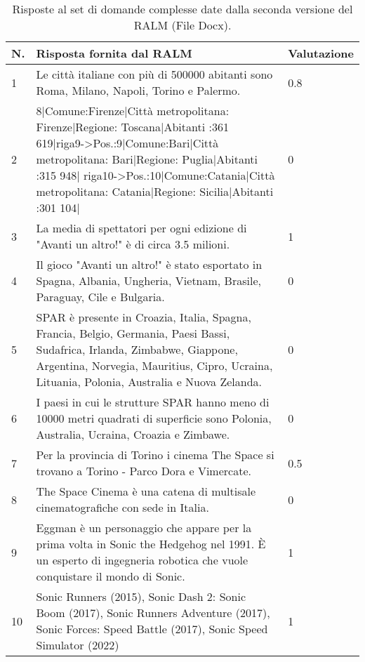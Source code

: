 \begin{table}[H]
    \centering
    \begin{tabular}{|p{0.5cm} |p{6cm} |p{2cm}|}
        \hline
        \textbf{N}. & \textbf{Risposta fornita dal RALM} & \textbf{Valutazione} \\
        \hline
        1 & Le città italiane con più di 500000 abitanti sono Roma, Milano, Napoli, Torino e Palermo. & 0.8 \\
        \hline
        2 & 8|Comune:Firenze|Città metropolitana: Firenze|Regione: Toscana|Abitanti :361 619|riga9->Pos.:9|Comune:Bari|Città metropolitana: Bari|Regione: Puglia|Abitanti :315 948| riga10->Pos.:10|Comune:Catania|Città metropolitana: Catania|Regione: Sicilia|Abitanti :301 104| & 0 \\
        \hline
        3 & La media di spettatori per ogni edizione di "Avanti un altro!" è di circa 3.5 milioni. & 1 \\
        \hline
        4 & Il gioco "Avanti un altro!" è stato esportato in Spagna, Albania, Ungheria, Vietnam, Brasile, Paraguay, Cile e Bulgaria. & 0 \\
        \hline
        5 & SPAR è presente in Croazia, Italia, Spagna, Francia, Belgio, Germania, Paesi Bassi, Sudafrica, Irlanda, Zimbabwe, Giappone, Argentina, Norvegia, Mauritius, Cipro, Ucraina, Lituania, Polonia, Australia e Nuova Zelanda. & 0 \\
        \hline
        6 & I paesi in cui le strutture SPAR hanno meno di 10000 metri quadrati di superficie sono Polonia, Australia, Ucraina, Croazia e Zimbawe. & 0 \\
        \hline
        7 & Per la provincia di Torino i cinema The Space si trovano a Torino - Parco Dora e Vimercate. & 0.5 \\
        \hline
        8 & The Space Cinema è una catena di multisale cinematografiche con sede in Italia. & 0 \\
        \hline
        9 & Eggman è un personaggio che appare per la prima volta in Sonic the Hedgehog nel 1991. È un esperto di ingegneria robotica che vuole conquistare il mondo di Sonic. & 1 \\
        \hline
        10 & Sonic Runners (2015), Sonic Dash 2: Sonic Boom (2017), Sonic Runners Adventure (2017), Sonic Forces: Speed Battle (2017), Sonic Speed Simulator (2022) & 1 \\
        \hline
    \end{tabular}
    \caption{Risposte al set di domande complesse date dalla seconda versione del RALM (File Docx).}
\end{table}

